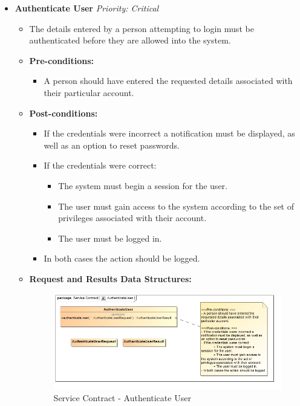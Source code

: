 \documentclass{article}
\begin{document}
\begin{itemize}
					\cleardoublepage
					\item \textbf{Authenticate User} \hfill \textit{Priority: Critical}
					\begin{itemize}
						\item The details entered by a person attempting to login must be authenticated before they are allowed into the system.
						\item \textbf{Pre-conditions:}
						\begin{itemize}
							\item A person should have entered the requested details associated with their particular account.
						\end{itemize}
						\item \textbf{Post-conditions:}
						\begin{itemize}
							\item If the credentials were incorrect a notification must be displayed, as well as an option to reset passwords.
							\item If the credentials were correct:
							\begin{itemize}
								\item The system must begin a session for the user.
								\item The user must gain access to the system according to the set of privileges associated with their account.
								\item The user must be logged in.
							\end{itemize}													
							\item In both cases the action should be logged.
						\end{itemize}
						\item \textbf{Request and Results Data Structures:}
						\begin{figure}[H]
							\includegraphics[width=\linewidth]{../Diagrams/ServiceContracts/AuthenticateUser.jpg}
							\caption{Service Contract - Authenticate User}
						\end{figure}
					\end{itemize}
					

\end{itemize}
\end{document}
